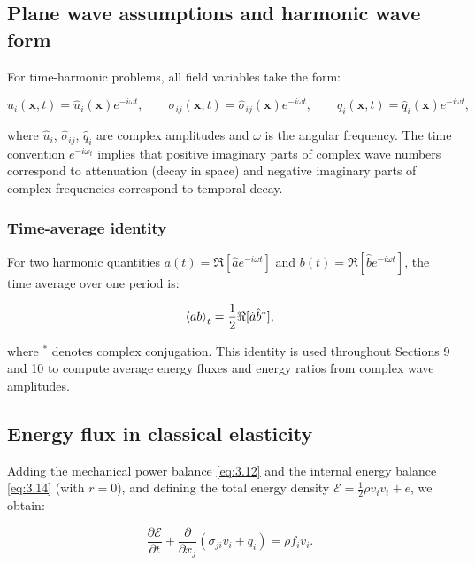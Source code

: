 \subsection{Plane wave assumptions and harmonic wave form}
\label{sec:3.7}

For time-harmonic problems, all field variables take the form:

\begin{equation}
u_i(\bm{x},t) = \hat{u}_i(\bm{x}) e^{-i\omega t},
\qquad
\sigma_{ij}(\bm{x},t) = \hat{\sigma}_{ij}(\bm{x}) e^{-i\omega t},
\qquad
q_i(\bm{x},t) = \hat{q}_i(\bm{x}) e^{-i\omega t},
\label{eq:3.26}
\end{equation}

where $\hat{u}_i$, $\hat{\sigma}_{ij}$, $\hat{q}_i$ are complex amplitudes and $\omega$ is the angular frequency. The time convention $e^{-i\omega_t}$ implies that positive imaginary parts of complex wave numbers correspond to attenuation (decay in space) and negative imaginary parts of complex frequencies correspond to temporal decay.

\subsubsection{Time-average identity}

For two harmonic quantities $a(t) = \Re[\hat{a} e^{-i\omega t}]$ and $b(t) = \Re[\hat{b} e^{-i\omega t}]$, the time average over one period is:

\begin{equation}
\left\langle ab \right\rangle_t = \frac{1}{2}\Re[\hat{a}\hat{b}^*],
\label{eq:3.27}
\end{equation}

where $^*$ denotes complex conjugation. This identity is used throughout Sections 9 and 10 to compute average energy fluxes and energy ratios from complex wave amplitudes.

\subsection{Energy flux in classical elasticity}
\label{sec:3.8}

Adding the mechanical power balance \eqref{eq:3.12} and the internal energy balance \eqref{eq:3.14} (with $r=0$), and defining the total energy density $\mathcal{E} = \frac{1}{2}\rho v_i v_i + e$, we obtain:

\begin{equation}
\frac{\partial\mathcal{E}}{\partial t}
+
\frac{\partial}{\partial x_j}\left(\sigma_{ji}v_i + q_i\right)
=
\rho f_i v_i.
\label{eq:3.28}
\end{equation}

